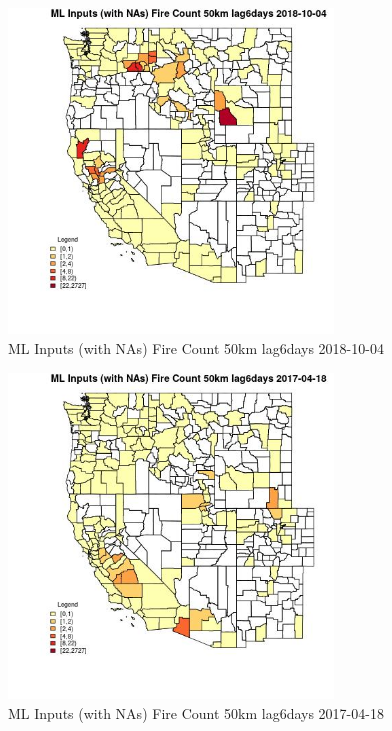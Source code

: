 \begin{figure} 
\centering  
\includegraphics[width=0.77\textwidth]{Code_Outputs/Report_ML_input_PM25_Step4_part_f_de_duplicated_aves_prioritize_24hr_obswNAs_CountyFire_Count_50km_lag6daysMean2018-10-04.jpg} 
\caption{\label{fig:Report_ML_input_PM25_Step4_part_f_de_duplicated_aves_prioritize_24hr_obswNAsCountyFire_Count_50km_lag6daysMean2018-10-04}ML Inputs (with NAs) Fire Count 50km lag6days 2018-10-04} 
\end{figure} 
 

\begin{figure} 
\centering  
\includegraphics[width=0.77\textwidth]{Code_Outputs/Report_ML_input_PM25_Step4_part_f_de_duplicated_aves_prioritize_24hr_obswNAs_CountyFire_Count_50km_lag6daysMean2017-04-18.jpg} 
\caption{\label{fig:Report_ML_input_PM25_Step4_part_f_de_duplicated_aves_prioritize_24hr_obswNAsCountyFire_Count_50km_lag6daysMean2017-04-18}ML Inputs (with NAs) Fire Count 50km lag6days 2017-04-18} 
\end{figure} 
 

